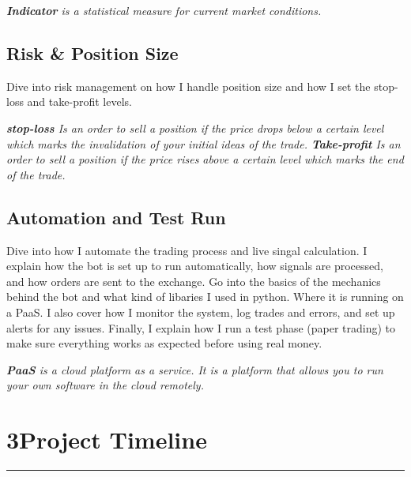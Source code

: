 \documentclass[12pt,a4paper]{article}
\begin{document}
\vspace{0.5em}
\noindent\textit{\footnotesize%
\textbf{Indicator} is a statistical measure for current market conditions.
}







\subsection{Risk \& Position Size}
Dive into risk management on how I handle position size and how I set the stop-loss and take-profit levels. 

\vspace{0.5em}
\noindent\textit{\footnotesize%
\textbf{stop-loss} Is an order to sell a position if the price drops below a certain level which marks the invalidation of your initial ideas of the trade.
\textbf{Take-profit} Is an order to sell a position if the price rises above a certain level which marks the end of the trade.
}




\newpage

\subsection{Automation and Test Run}
Dive into how I automate the trading process and live singal calculation. I explain how the bot
is set up to run automatically, how signals are processed, and how orders
are sent to the exchange.
Go into the basics of the mechanics behind the bot and what kind of libaries I used in python. Where it is running on a PaaS.
I also cover how I monitor the system, log trades
and errors, and set up alerts for any issues. Finally, I explain how I run a
test phase (paper trading) to make sure everything works as expected before
using real money.

\vspace{0.5em}
\noindent\textit{\footnotesize%
\textbf{PaaS} is a cloud platform as a service. It is a platform that allows you to run your own software in the cloud remotely.}


\section*{3\hspace{1em}Project Timeline}
\vspace{-0.5em}
\noindent\rule{\textwidth}{0.5pt}
\end{document}
